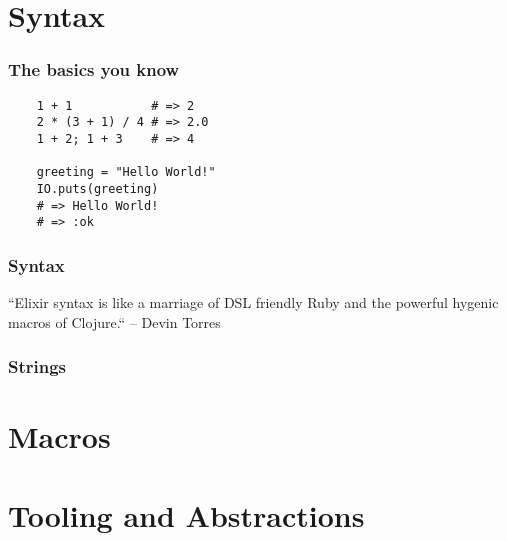 \documentclass{beamer}
\begin{document}
\section[Section]{Syntax}

\begin{frame}[fragile]
  \frametitle{The basics you know}
  \begin{lstlisting}
    1 + 1           # => 2
    2 * (3 + 1) / 4 # => 2.0
    1 + 2; 1 + 3    # => 4

    greeting = "Hello World!"
    IO.puts(greeting)
    # => Hello World!
    # => :ok
  \end{lstlisting}
\end{frame}

\begin{frame}
  \frametitle{Syntax}
  ``Elixir syntax is like a marriage of DSL
  friendly Ruby and the powerful hygenic macros of Clojure.``
  \linebreak
  \textrm{-- Devin Torres}
\end{frame}

\begin{frame}
  \frametitle{Strings}
\end{frame}

\section[Section]{Macros}

\section[Section]{Tooling and Abstractions}
  
\end{document}
